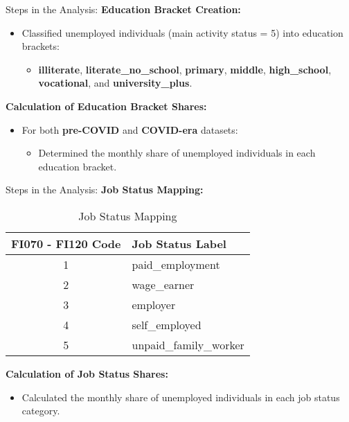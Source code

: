 \documentclass[
	11pt, %
]{beamer}
\begin{document}
\begin{frame}{Steps in the Analysis:}
    \textbf{Education Bracket Creation:}
    \begin{itemize}
        \item Classified unemployed individuals (main activity status = 5) into education brackets:
        \begin{itemize}
            \item \textbf{illiterate}, \textbf{literate\_no\_school}, \textbf{primary}, \textbf{middle}, \textbf{high\_school}, \textbf{vocational}, and \textbf{university\_plus}.
        \end{itemize}
    \end{itemize}
    
    \textbf{Calculation of Education Bracket Shares:}
    \begin{itemize}
        \item For both \textbf{pre-COVID} and \textbf{COVID-era} datasets:
        \begin{itemize}
            \item Determined the monthly share of unemployed individuals in each education bracket.
        \end{itemize}
    \end{itemize}
\end{frame}

\begin{frame}{Steps in the Analysis:}
    \textbf{Job Status Mapping:}
    \begin{table}[]
        \centering
        \begin{tabular}{|c|l|}
            \hline
            \textbf{FI070 - FI120 Code} & \textbf{Job Status Label} \\ \hline
            1                  & paid\_employment          \\ \hline
            2                  & wage\_earner              \\ \hline
            3                  & employer                  \\ \hline
            4                  & self\_employed            \\ \hline
            5                  & unpaid\_family\_worker    \\ \hline
        \end{tabular}
        \caption{Job Status Mapping}
        \label{tab:job_status}
    \end{table}
    
    \vspace{0.5cm}
    \textbf{Calculation of Job Status Shares:}
    \begin{itemize}
        \item Calculated the monthly share of unemployed individuals in each job status category.
    \end{itemize}
\end{frame}
\end{document}
